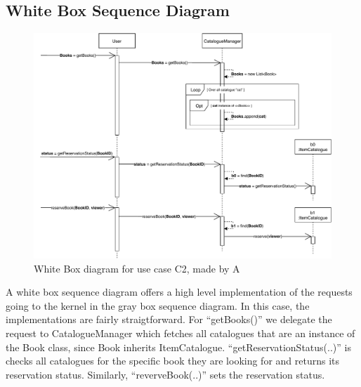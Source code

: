 \subsection*{White Box Sequence Diagram}
\begin{figure}[H]
	\centering
	\includegraphics[scale=.80]{uml/SD-wb-reserve.pdf}
	\caption*{White Box diagram for use case C2, made by A}
\end{figure}
A white box sequence diagram offers a high level implementation of the requests going to the kernel in the gray box sequence diagram. In this case, the implementations are fairly straigtforward. For ``getBooks()'' we delegate the request to CatalogueManager which fetches all catalogues that are an instance of the Book class, since Book inherits ItemCatalogue. ``getReservationStatus(..)'' is checks all catalogues for the specific book they are looking for and returns its reservation status. Similarly, ``reverveBook(..)'' sets the reservation status.